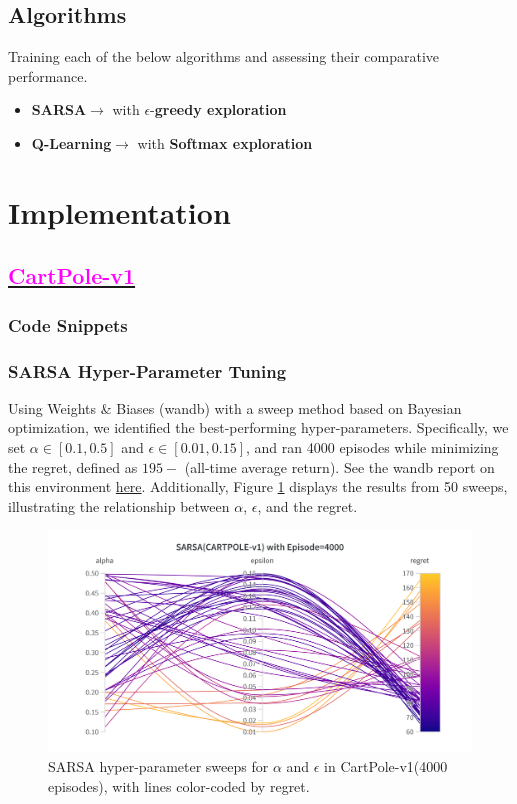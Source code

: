 \documentclass[11pt, a4]{article}
\begin{document}
		\subsection{Algorithms}
		Training each of the below algorithms and assessing their comparative performance.
		\begin{itemize}
			\item \textbf{SARSA}$\rightarrow$ with $\epsilon$-\textbf{greedy exploration}
			\item \textbf{Q-Learning}$\rightarrow$ with \textbf{Softmax exploration}
		\end{itemize}
	\section{Implementation}
		\subsection{\href{https://github.com/RitabrataMandal/RL-DA6400-assignment_1/tree/main/cartpole-v1}{\textcolor{magenta}{CartPole-v1}}}
			\subsubsection{Code Snippets}
%				
			\subsubsection{SARSA Hyper-Parameter Tuning}  
			Using Weights \& Biases (wandb) with a sweep method based on Bayesian optimization, we identified the best-performing hyper-parameters. Specifically, we set $\alpha \in [0.1, 0.5]$ and $\epsilon \in [0.01, 0.15]$, and ran 4000 episodes while minimizing the regret, defined as \(195 -\) (all-time average return). See the wandb report on this environment \href{https://api.wandb.ai/links/ee24e009-iitm/0hseqrps}{here}. Additionally, Figure \ref{fig:sarsacartpole-regret} displays the results from 50 sweeps, illustrating the relationship between $\alpha$, $\epsilon$, and the regret.
				\begin{figure}[H]
					\centering
					\includegraphics[width=1\linewidth]{sarsa-hyp-tuning-cartpole.png}
					\caption{SARSA hyper-parameter sweeps for $\alpha$ and $\epsilon$ in CartPole-v1(4000 episodes), with lines color-coded by regret.}
					\label{fig:sarsacartpole-regret}
				\end{figure}
\end{document}
